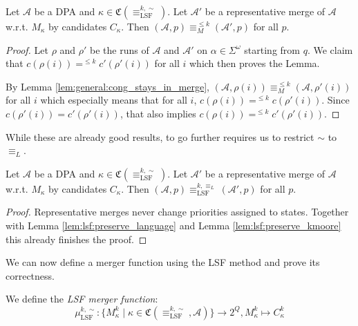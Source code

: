 \begin{lem}
	Let $\mathcal{A}$ be a DPA and $\kappa \in \mathfrak{C}(\equiv_\text{LSF}^{k,\sim})$. Let $\mathcal{A}'$ be a representative merge of $\mathcal{A}$ w.r.t. $M_\kappa$ by candidates $C_\kappa$. Then $(\mathcal{A}, p) \equiv_M^{\leq k} (\mathcal{A}', p)$ for all $p$.
	\label{lem:lsf:preserve_kmoore}
\end{lem}

\begin{proof}
	Let $\rho$ and $\rho'$ be the runs of $\mathcal{A}$ and $\mathcal{A}'$ on $\alpha \in \Sigma^\omega$ starting from $q$. We claim that $c(\rho(i)) =^{\leq k} c'(\rho'(i))$ for all $i$ which then proves the Lemma.
	
	By Lemma \ref{lem:general:cong_stays_in_merge}, $(\mathcal{A}, \rho(i)) \equiv_M^{\leq k} (\mathcal{A}, \rho'(i))$ for all $i$ which especially means that for all $i$, $c(\rho(i)) =^{\leq k} c(\rho'(i))$. Since $c(\rho'(i)) = c'(\rho'(i))$, that also implies $c(\rho(i)) =^{\leq k} c'(\rho'(i))$.
\end{proof}

\vspace{10pt}

While these are already good results, to go further requires us to restrict $\sim$ to $\equiv_L$.

\begin{lem} 
	Let $\mathcal{A}$ be a DPA and $\kappa \in \mathfrak{C}(\equiv_\text{LSF}^{k,\sim})$. Let $\mathcal{A}'$ be a representative merge of $\mathcal{A}$ w.r.t. $M_\kappa$ by candidates $C_\kappa$. Then $(\mathcal{A}, p) \equiv_\text{LSF}^{k,\equiv_L} (\mathcal{A}', p)$ for all $p$.
	\label{lem:lsf:preserve_lsf}
\end{lem}

\begin{proof}
	Representative merges never change priorities assigned to states. Together with Lemma \ref{lem:lsf:preserve_language} and Lemma \ref{lem:lsf:preserve_kmoore} this already finishes the proof.
\end{proof}


\vspace{10pt}

We can now define a merger function using the LSF method and prove its correctness.

\begin{defn}
	We define the \emph{LSF merger function}: $$\mu_\text{LSF}^{k,\sim} : \{ M^k_\kappa \mid \kappa \in \mathfrak{C}(\equiv_\text{LSF}^{k,\sim}, \mathcal{A}) \} \rightarrow 2^Q , M^k_\kappa \mapsto C^k_\kappa $$
\end{defn}

